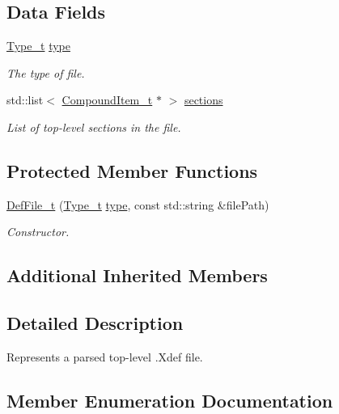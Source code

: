 \subsection*{Data Fields}
\begin{DoxyCompactItemize}
\item 
\hyperlink{struct_def_file__t_a59fae89a0e59f29d463910ebff12ebde}{Type\+\_\+t} \hyperlink{struct_def_file__t_ab67aaecc9147b7a9f813b0dbf1a09bbc}{type}
\begin{DoxyCompactList}\small\item\em The type of file. \end{DoxyCompactList}\item 
std\+::list$<$ \hyperlink{struct_compound_item__t}{Compound\+Item\+\_\+t} $\ast$ $>$ \hyperlink{struct_def_file__t_abee249966e9eda480f28c2a394b69469}{sections}
\begin{DoxyCompactList}\small\item\em List of top-\/level sections in the file. \end{DoxyCompactList}\end{DoxyCompactItemize}
\subsection*{Protected Member Functions}
\begin{DoxyCompactItemize}
\item 
\hyperlink{struct_def_file__t_a8fbf5663f2d6bf19eba946e1ebaec5ff}{Def\+File\+\_\+t} (\hyperlink{struct_def_file__t_a59fae89a0e59f29d463910ebff12ebde}{Type\+\_\+t} \hyperlink{struct_def_file__t_ab67aaecc9147b7a9f813b0dbf1a09bbc}{type}, const std\+::string \&file\+Path)
\begin{DoxyCompactList}\small\item\em Constructor. \end{DoxyCompactList}\end{DoxyCompactItemize}
\subsection*{Additional Inherited Members}


\subsection{Detailed Description}
Represents a parsed top-\/level .Xdef file. 

\subsection{Member Enumeration Documentation}
